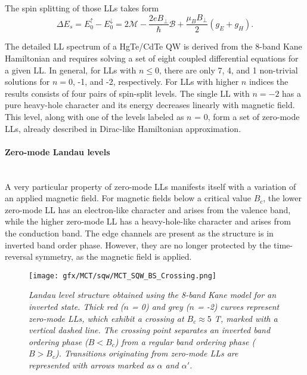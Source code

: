 \documentclass[titlepage,a4paper]{book}
\newcommand{\wciecie}{\quad\phantom{v}}
\newcommand{\myparagraph}[1]{\paragraph{#1}\mbox{}\\}
\begin{document}
The spin splitting of those LLs takes form
\begin{equation}
\label{eq:MCT_SQW_ZeroMode_SpinSplitting}
\Delta E_s = E^{\uparrow}_0 - E^{\downarrow}_0 = 2\mathcal{M} -\frac{2eB_{\perp}}{\hbar}\mathcal{B}+\frac{\mu_B B_{\perp}}{2}(g_E + g_H). 
\end{equation}

The detailed LL spectrum of a HgTe/CdTe QW is derived from the 8-band Kane Hamiltonian and requires solving a set of eight coupled differential equations for a given LL. In general, for LLs with $n \leq 0$, there are only 7, 4, and 1 non-trivial solutions for $n = 0$, -1, and -2, respectively. For LLs with higher $n$ indices the results consists of four pairs of spin-split levels. The single LL with $n = -2$ has a pure heavy-hole character and its energy decreases linearly with magnetic field. This level, along with one of the levels labeled as $n$ = 0, form a set of zero-mode LLs, already described in Dirac-like Hamiltonian approximation.

\myparagraph{Zero-mode Landau levels}
\wciecie
A very particular property of zero-mode LLs manifests itself with a variation of an applied magnetic field. For magnetic fields below a critical value $B_c$, the lower zero-mode LL has an electron-like character and arises from the valence band, while the higher zero-mode LL has a heavy-hole-like character and arises from the conduction band. The edge channels are present as the structure is in inverted band order phase. However, they are no longer protected by the time-reversal symmetry, as the magnetic field is applied. 

\begin{figure}[ht]
	\centering
	\texttt{[image: gfx/MCT/sqw/MCT\_SQW\_BS\_Crossing.png]}
	\vspace{-10pt}
	\caption{\textit{Landau level structure obtained using the 8-band Kane model for an inverted state. Thick red ($n$ = 0) and grey ($n$ = -2) curves represent zero-mode LLs, which exhibit a crossing at $B_c \approx 5$ T, marked with a vertical dashed line. The crossing point separates an inverted band ordering phase ($B < B_c$) from a regular band ordering phase ($B > B_c$). Transitions originating from zero-mode LLs are represented with arrows marked as $\alpha$ and $\alpha'$.}}
	\label{fig:MCT_SQW_BS_Crossing}
\end{figure} 
\end{document}
